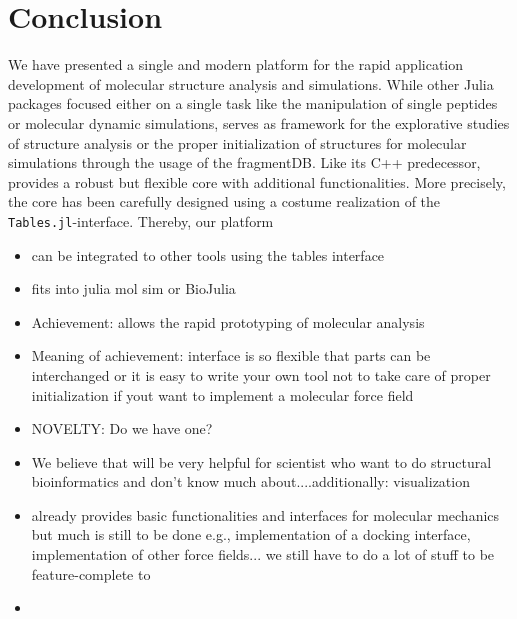 
\section{Conclusion}

We have presented a single and modern platform for the rapid application development of molecular structure analysis and simulations. While other Julia packages focused either on a single task like the manipulation of single peptides or molecular dynamic simulations, \biochem serves as framework for the explorative studies of structure analysis or the proper initialization of structures for molecular simulations through the usage of the fragmentDB. Like its C++ predecessor, \biochem provides a robust but flexible core with additional functionalities. More precisely, the core has been carefully designed using a costume realization of the \texttt{Tables.jl}-interface. Thereby, our platform 
\begin{itemize}
	\item can be integrated to other tools using the tables interface
	\item fits into julia mol sim or BioJulia
	\item Achievement: \biochem allows the rapid prototyping of molecular analysis 
	\item Meaning of achievement: interface is so flexible that parts can be interchanged or it is easy to write your own tool not to take care of proper initialization if yout want to implement a molecular force field 
	\item NOVELTY: Do we have one? 
	\item We believe that \biochem will be very helpful for scientist who want to do structural bioinformatics and don't know much about....additionally: visualization
	\item \biochem already provides basic functionalities and interfaces for molecular mechanics but much is still to be done e.g., implementation of a docking interface, implementation of other force fields... we still have to do a lot of stuff to be feature-complete to \ball
	\item 
\end{itemize}